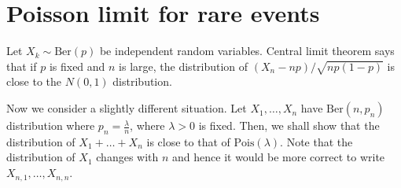 \documentclass[preprint,  11pt]{amsart}
\theoremstyle{plain} %
\theoremstyle{definition} %
\begin{document}







\newpage
\section{Poisson limit for rare events}
Let $X_{k}\sim \mbox{Ber}(p)$ be independent random variables. Central limit theorem says that if $p$ is fixed and $n$ is large, the distribution of $(X_{n}-np)/\sqrt{np(1-p)}$ is close to the  $N(0,1)$ distribution. 

Now we consider a slightly different situation. Let $X_{1},\ldots ,X_{n}$ have $\mbox{Ber}(n,p_{n})$ distribution where $p_{n}=\frac{\lambda}{n}$, where $\lambda>0$ is fixed. Then, we shall show that the distribution of $X_{1}+\ldots +X_{n}$ is close to that of $\mbox{Pois}(\lambda)$. Note that the distribution of $X_{1}$ changes with $n$ and hence it would be more correct to write $X_{n,1}, \ldots ,X_{n,n}$. 
\end{document}
